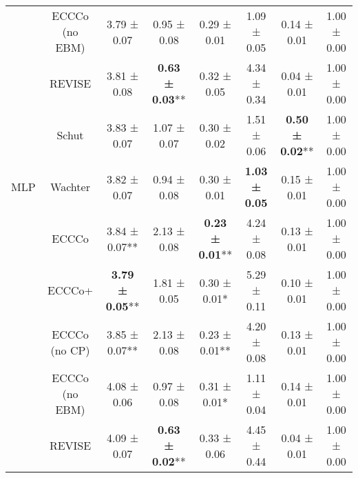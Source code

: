 \begin{table}
{\begin{tabular}[t]{cccccccc}
 & ECCCo (no EBM) & 3.79 ± 0.07\hphantom{*}\hphantom{*} & 0.95 ± 0.08\hphantom{*}\hphantom{*} & 0.29 ± 0.01\hphantom{*}\hphantom{*} & 1.09 ± 0.05\hphantom{*}\hphantom{*} & 0.14 ± 0.01\hphantom{*}\hphantom{*} & 1.00 ± 0.00\hphantom{*}\hphantom{*}\\

 & REVISE & 3.81 ± 0.08\hphantom{*}\hphantom{*} & \textbf{0.63 ± 0.03}** & 0.32 ± 0.05\hphantom{*}\hphantom{*} & 4.34 ± 0.34\hphantom{*}\hphantom{*} & 0.04 ± 0.01\hphantom{*}\hphantom{*} & 1.00 ± 0.00\hphantom{*}\hphantom{*}\\

 & Schut & 3.83 ± 0.07\hphantom{*}\hphantom{*} & 1.07 ± 0.07\hphantom{*}\hphantom{*} & 0.30 ± 0.02\hphantom{*}\hphantom{*} & 1.51 ± 0.06\hphantom{*}\hphantom{*} & \textbf{0.50 ± 0.02}** & 1.00 ± 0.00\hphantom{*}\hphantom{*}\\

\multirow[t]{-7}{*}{\centering\arraybackslash MLP} & Wachter & 3.82 ± 0.07\hphantom{*}\hphantom{*} & 0.94 ± 0.08\hphantom{*}\hphantom{*} & 0.30 ± 0.01\hphantom{*}\hphantom{*} & \textbf{1.03 ± 0.05}\hphantom{*}\hphantom{*} & 0.15 ± 0.01\hphantom{*}\hphantom{*} & 1.00 ± 0.00\hphantom{*}\hphantom{*}\\
\cmidrule{1-8}
 & ECCCo & 3.84 ± 0.07** & 2.13 ± 0.08\hphantom{*}\hphantom{*} & \textbf{0.23 ± 0.01}** & 4.24 ± 0.08\hphantom{*}\hphantom{*} & 0.13 ± 0.01\hphantom{*}\hphantom{*} & 1.00 ± 0.00\hphantom{*}\hphantom{*}\\

 & ECCCo+ & \textbf{3.79 ± 0.05}** & 1.81 ± 0.05\hphantom{*}\hphantom{*} & 0.30 ± 0.01*\hphantom{*} & 5.29 ± 0.11\hphantom{*}\hphantom{*} & 0.10 ± 0.01\hphantom{*}\hphantom{*} & 1.00 ± 0.00\hphantom{*}\hphantom{*}\\

 & ECCCo (no CP) & 3.85 ± 0.07** & 2.13 ± 0.08\hphantom{*}\hphantom{*} & 0.23 ± 0.01** & 4.20 ± 0.08\hphantom{*}\hphantom{*} & 0.13 ± 0.01\hphantom{*}\hphantom{*} & 1.00 ± 0.00\hphantom{*}\hphantom{*}\\

 & ECCCo (no EBM) & 4.08 ± 0.06\hphantom{*}\hphantom{*} & 0.97 ± 0.08\hphantom{*}\hphantom{*} & 0.31 ± 0.01*\hphantom{*} & 1.11 ± 0.04\hphantom{*}\hphantom{*} & 0.14 ± 0.01\hphantom{*}\hphantom{*} & 1.00 ± 0.00\hphantom{*}\hphantom{*}\\

 & REVISE & 4.09 ± 0.07\hphantom{*}\hphantom{*} & \textbf{0.63 ± 0.02}** & 0.33 ± 0.06\hphantom{*}\hphantom{*} & 4.45 ± 0.44\hphantom{*}\hphantom{*} & 0.04 ± 0.01\hphantom{*}\hphantom{*} & 1.00 ± 0.00\hphantom{*}\hphantom{*}\\


\end{tabular}}
\end{table}
